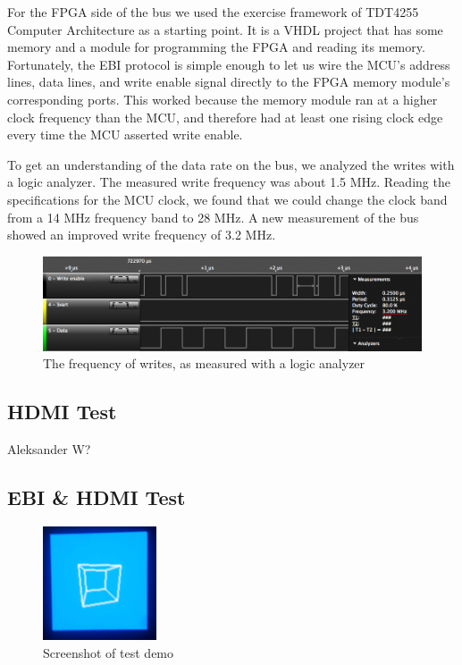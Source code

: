 For the FPGA side of the bus we used the exercise framework of TDT4255 Computer Architecture as a starting point.
It is a VHDL project that has some memory and a module for programming the FPGA and reading its memory.
Fortunately, the EBI protocol is simple enough to let us wire the MCU's address lines, data lines, and write enable signal directly to the FPGA memory module's corresponding ports.
This worked because the memory module ran at a higher clock frequency than the MCU, and therefore had at least one rising clock edge every time the MCU asserted write enable.

To get an understanding of the data rate on the bus, we analyzed the writes with a logic analyzer.
The measured write frequency was about 1.5 MHz.
Reading the specifications for the MCU clock, we found that we could change the clock band from a 14 MHz frequency band to 28 MHz.
A new measurement of the bus showed an improved write frequency of 3.2 MHz.

\begin{figure}[htp]
\centering
\includegraphics[width=\textwidth]{diagrams/ebi_bus_write_speed.png}
\caption{The frequency of writes, as measured with a logic analyzer}
\label{ebi_bis_write_speed}
\end{figure}

\subsection{HDMI Test}
Aleksander W?

\subsection{EBI \& HDMI Test}

\begin{figure}
\centering
\includegraphics[width=0.3\textwidth]{diagrams/prototype_demo.png}
\caption{Screenshot of test demo}
\label{prototype_demo}
\end{figure}

